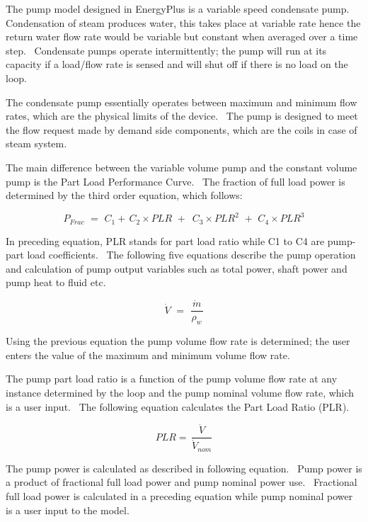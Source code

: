 The pump model designed in EnergyPlus is a variable speed condensate pump.~ Condensation of steam produces water, this takes place at variable rate hence the return water flow rate would be variable but constant when averaged over a time step.~ Condensate pumps operate intermittently; the pump will run at its capacity if a load/flow rate is sensed and will shut off if there is no load on the loop.

The condensate pump essentially operates between maximum and minimum flow rates, which are the physical limits of the device.~ The pump is designed to meet the flow request made by demand side components, which are the coils in case of steam system.

The main difference between the variable volume pump and the constant volume pump is the Part Load Performance Curve.~ The fraction of full load power is determined by the third order equation, which follows:

\begin{equation}
{P_{Frac}}\,\, = \,\,{C_1} + \,{C_2} \times PLR\,\, + \,\,\,{C_3} \times PL{R^2}\,\, + \,\,{C_4} \times PL{R^3}
\end{equation}

In preceding equation, PLR stands for part load ratio while C1 to C4 are pump- part load coefficients.~ The following five equations describe the pump operation and calculation of pump output variables such as total power, shaft power and pump heat to fluid etc.

\begin{equation}
\dot V\,\, = \,\,\frac{{\,\dot m\,}}{{{\rho_w}}}
\end{equation}

Using the previous equation the pump volume flow rate is determined; the user enters the value of the maximum and minimum volume flow rate.

The pump part load ratio is a function of the pump volume flow rate at any instance determined by the loop and the pump nominal volume flow rate, which is a user input.~ The following equation calculates the Part Load Ratio (PLR).

\begin{equation}
PLR = \,\frac{{\dot V}}{{{{\dot V}_{nom}}}}
\end{equation}

The pump power is calculated as described in following equation.~ Pump power is a product of fractional full load power and pump nominal power use.~ Fractional full load power is calculated in a preceding equation while pump nominal power is a user input to the model.

